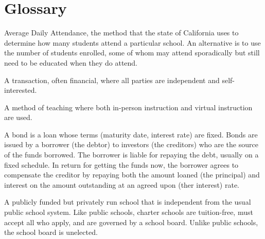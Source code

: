 
\chapter{Glossary}\label{ch:glossary}


\begin{description}[nosep]\DoubleSpacing%


  \medskip\item[ADA] Average Daily Attendance, the method that the state of California uses to determine how many students attend a particular school. An alternative is to use the number of students enrolled, some of whom may attend sporadically but still need to be educated when they do attend. \parencite{SACS2019}

  \medskip\item[arm's length transaction] A transaction, often financial, where all parties are independent and self-interested. \parencite{Wex2024}

  \medskip\item[blended learning] A method of teaching where both in-person instruction and virtual instruction are used. \parencite{Graham2018}

  \medskip\item[bond] A bond is a loan whose terms (maturity date, interest rate) are fixed. Bonds are issued by a borrower (the debtor) to investors (the creditors) who are the source of the funds borrowed. The borrower is liable for repaying the debt, usually on a fixed schedule. In return for getting the funds now, the borrower agrees to compensate the creditor by repaying both the amount loaned (the principal) and interest on the amount outstanding at an agreed upon (ther interest) rate. \parencite{Borad2015}

  \medskip\item[charter school] A publicly funded but privately run school that is independent from the usual public school system. Like public schools, charter schools are tuition-free, must accept all who apply, and are governed by a school board. Unlike public schools, the school board is unelected. \parencite{CDE2023, CSBA2016, Eckes2024}


\end{description}
